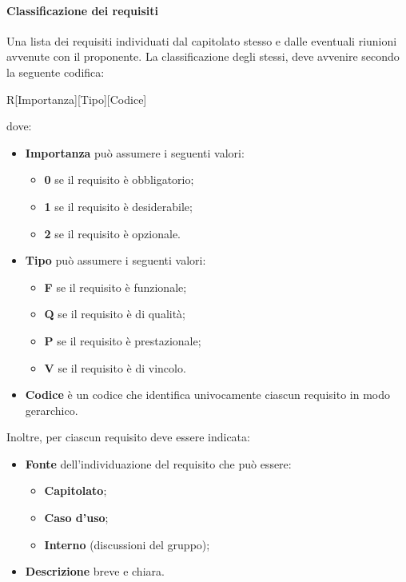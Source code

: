 \documentclass[../NormeDiProgetto.tex]{subfiles}
\begin{document}
				\paragraph{Classificazione dei requisiti\\}
					Una lista dei requisiti individuati dal capitolato stesso e dalle
					eventuali riunioni avvenute con il proponente. La classificazione
					degli stessi, deve avvenire secondo la seguente codifica:
					\begin{center}
						R[Importanza][Tipo][Codice]
					\end{center}
					dove:
					\begin{itemize}
						\item \textbf{Importanza} può assumere i seguenti valori:
						\begin{itemize}
							\item \textbf{0} se il requisito è obbligatorio;
							\item \textbf{1} se il requisito è desiderabile;
							\item \textbf{2} se il requisito è opzionale.
						\end{itemize}
						\item \textbf{Tipo} può assumere i seguenti valori:
						\begin{itemize}
							\item \textbf{F} se il requisito è funzionale;
							\item \textbf{Q} se il requisito è di qualità;
							\item \textbf{P} se il requisito è prestazionale;
							\item \textbf{V} se il requisito è di vincolo.
						\end{itemize}
						\item \textbf{Codice} è un codice che identifica univocamente
						ciascun requisito in modo gerarchico.
					\end{itemize}
					Inoltre, per ciascun requisito deve essere indicata:
					\begin{itemize}
						\item \textbf{Fonte} dell'individuazione del requisito che può essere:
						\begin{itemize}
							\item \textbf{Capitolato};
							\item \textbf{Caso d'uso};
							\item \textbf{Interno} (discussioni del gruppo);
						\end{itemize}
						\item \textbf{Descrizione} breve e chiara.
					\end{itemize}
\end{document}

